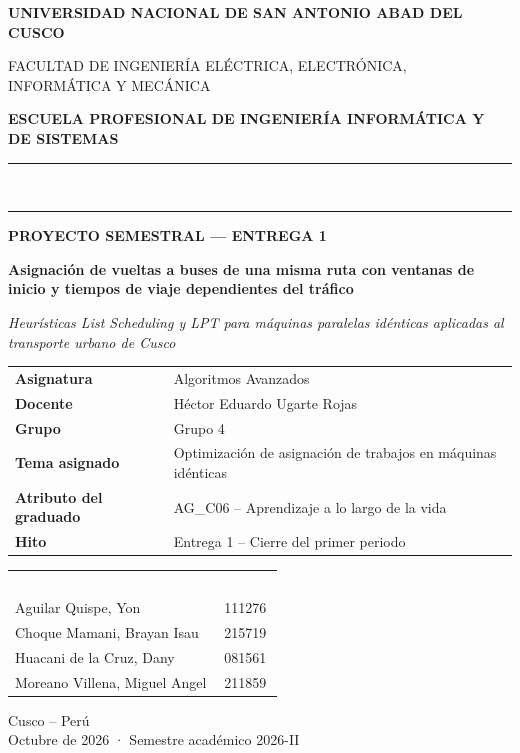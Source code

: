 \begin{titlepage}
\centering
\thispagestyle{empty}
{\Large\bfseries\color{guinda} UNIVERSIDAD NACIONAL DE SAN ANTONIO ABAD DEL CUSCO\par}
\vspace{4pt}
{\small FACULTAD DE INGENIERÍA ELÉCTRICA, ELECTRÓNICA, INFORMÁTICA Y MECÁNICA\par}
\vspace{2pt}
{\bfseries ESCUELA PROFESIONAL DE INGENIERÍA INFORMÁTICA Y DE SISTEMAS\par}
\vspace{10pt}
{\color{guinda}\rule{\textwidth}{1.5pt}}\\[-8pt]
{\color{dorado}\rule{\textwidth}{0.6pt}}

\vspace{1.6cm}
{\large\bfseries\color{dorado} PROYECTO SEMESTRAL — ENTREGA 1\par}
\vspace{0.8cm}
{\LARGE\bfseries\color{guinda} Asignación de vueltas a buses de una misma ruta con ventanas de inicio y tiempos de viaje dependientes del tráfico\par}
\vspace{0.5cm}
{\large\itshape Heurísticas List Scheduling y LPT para máquinas paralelas idénticas aplicadas al transporte urbano de Cusco\par}

\vspace{1.4cm}
\begin{tabular}{>{\bfseries}L{4.2cm}L{8.6cm}}
\toprule
Asignatura & Algoritmos Avanzados \\
Docente & Héctor Eduardo Ugarte Rojas \\
Grupo & Grupo 4 \\
Tema asignado & Optimización de asignación de trabajos en máquinas idénticas \\
Atributo del graduado & AG\_C06 – Aprendizaje a lo largo de la vida \\
Hito & Entrega 1 – Cierre del primer periodo \\
\bottomrule
\end{tabular}

\vspace{0.8cm}
\begin{tabular}{L{8.6cm}c}
\textcolor{white}{\bfseries Integrantes} & \textcolor{white}{\bfseries Código} \\
Aguilar Quispe, Yon & 111276 \\
Choque Mamani, Brayan Isau & 215719 \\
Huacani de la Cruz, Dany & 081561 \\
Moreano Villena, Miguel Angel & 211859 \\
\bottomrule
\end{tabular}

\vfill
Cusco – Perú\\
Octubre de 2026 · Semestre académico 2026-II
\end{titlepage}
